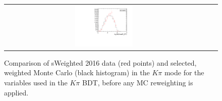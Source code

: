 \begin{figure}
\begin{tabular}{ccc}
\includegraphics[width=0.3\textwidth]{ANA_resources/Plots/Monte_carlo/data_vs_MC//Kpi/log10(KstarPi_PT)_2016.pdf} & & \\
\end{tabular}
\caption{Comparison of sWeighted 2016 data (red points) and selected, weighted Monte Carlo (black histogram) in the $K\pi$ mode for the variables used in the $K\pi$ BDT, before any MC reweighting is applied.}
\label{fig:data_vs_MC_Kpi_2016_unweighted}
\end{figure}

